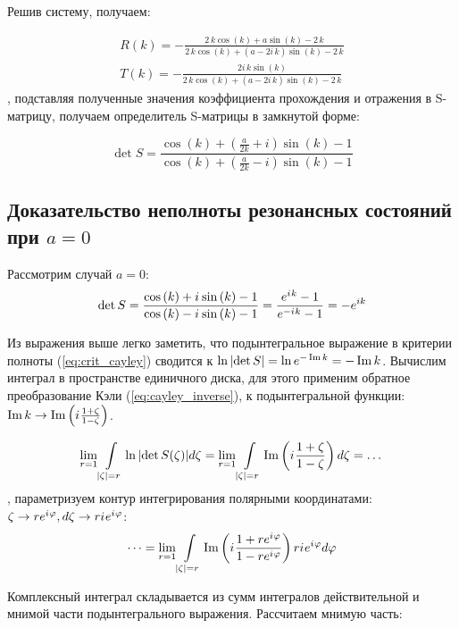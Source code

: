 Решив систему, получаем:

\begin{align*}
R(k) = -\frac{2 \, k \cos\left(k\right) + a \sin\left(k\right) - 2 \, k}{2 \, k \cos\left(k\right) + {\left(a - 2 i \, k\right)} \sin\left(k\right) - 2 \, k} \\
T(k) = -\frac{2 i \, k \sin\left(k\right)}{2 \, k \cos\left(k\right) + {\left(a - 2 i \, k\right)} \sin\left(k\right) - 2 \, k}
\end{align*}
, подставляя полученные значения коэффициента прохождения и отражения в S-матрицу, получаем определитель S-матрицы в замкнутой форме:

\begin{equation}\label{eq:ring_detS}
\det S = 
\frac
{\cos\left(k\right) + {\left(\frac{a}{2 k} + i\right)} \sin\left(k\right) - 1}
{\cos\left(k\right) + {\left(\frac{a}{2 k} - i\right)} \sin\left(k\right) - 1}
\end{equation}


\subsection{Доказательство неполноты резонансных состояний при $a=0$}\label{sec:ring_incompl_proof}
Рассмотрим случай $a=0$:
\[
\det S
= \frac
{\cos\left(k\right) + {i\mkern1mu} \sin\left(k\right) - 1}
{\cos\left(k\right) - {i\mkern1mu} \sin\left(k\right) - 1}
= \frac{e^{{i\mkern1mu} k} - 1}{e^{-{i\mkern1mu} k} - 1}
= -e^{i k}
\]

Из выражения выше легко заметить, что подынтегральное выражение в критерии полноты (\ref{eq:crit_cayley}) сводится к $\ln \abs{\det S} = \ln e^{- \operatorname{Im} k} = -\operatorname{Im} k$. Вычислим интеграл в пространстве единичного диска, для этого применим обратное преобразование Кэли (\ref{eq:cayley_inverse}), к подынтегральной функции: $\operatorname{Im} k \to \operatorname{Im} \left( {i\mkern1mu} \frac{1 + \zeta}{1 - \zeta} \right) $.

\[
  \lim\limits_{r = 1} \int\limits_{\abs{\zeta} = r} \ln \abs{\det S(\zeta)} d \zeta
= \lim\limits_{r = 1} \int\limits_{\abs{\zeta} = r} \operatorname{Im} \left( {i\mkern1mu} \frac{1 + \zeta}{1 - \zeta} \right)  d\zeta = \dots
\]
, параметризуем контур интегрирования полярными координатами: $\zeta \to r e^{{i\mkern1mu} \varphi}, d\zeta \to r {i\mkern1mu} e^{{i\mkern1mu} \varphi}$:
\[
\dots = \lim\limits_{r = 1} \int\limits_{\abs{\zeta} = r} \operatorname{Im} \left( {i\mkern1mu} \frac{1 + r e^{{i\mkern1mu} \varphi}}{1 - r e^{{i\mkern1mu} \varphi}} \right) r {i\mkern1mu} e^{{i\mkern1mu} \varphi} d\varphi
\]

Комплексный интеграл складывается из сумм интегралов действительной и мнимой части подынтегрального выражения. Рассчитаем мнимую часть:

